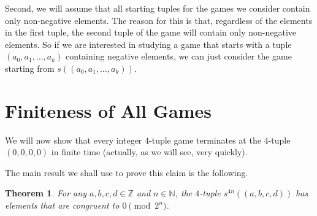 \documentclass[12pt]{amsart}
\newtheorem{theorem}{Theorem}[section]
\newcommand{\z}{\mathbb{Z}}
\newcommand{\diff}{s}
\newcommand{\znn}{\mathbb{N}}
\begin{document}
Second, we will assume that all starting tuples for the games we consider contain only non-negative elements. The reason for this is that, regardless of the elements in the first tuple, the second tuple of the game will contain only non-negative elements. So if we are interested in studying a game that starts with a tuple $(a_0, a_1, \dots, a_k)$ containing negative elements, we can just consider the game starting from $\diff((a_0, a_1, \dots, a_k))$.

\section{Finiteness of All Games\label{sec:convergence}}

We will now show that every integer $4$-tuple game terminates at the $4$-tuple $(0,0,0,0)$ in finite time (actually, as we will see, very quickly).

The main result we shall use to prove this claim is the following.
\begin{theorem}
For any $a,b,c,d \in \z$ and $n \in \znn$, the $4$-tuple $\diff^{4n}((a, b, c, d))$ has elements that are congruent to $0\pmod{2^n}$.
\label{thm:pow2}
\end{theorem}
\end{document}
